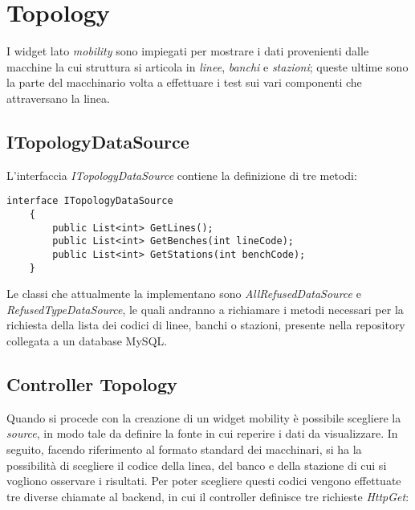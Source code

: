 \section{Topology}
\label{chap:topology}
I widget lato \textit{mobility} sono impiegati per mostrare i dati provenienti dalle macchine la cui struttura si articola in \textit{linee}, \textit{banchi} e \textit{stazioni}; queste ultime sono la parte del macchinario volta a effettuare i test sui vari componenti che attraversano la linea.

\subsection{ITopologyDataSource}
L'interfaccia \textit{ITopologyDataSource} contiene la definizione di tre metodi:

\begin{lstlisting}[caption={ITopologyDataSource.cs}, style=javaScriptCode]
    interface ITopologyDataSource
    {
        public List<int> GetLines();
        public List<int> GetBenches(int lineCode);
        public List<int> GetStations(int benchCode);
    }
\end{lstlisting}
Le classi che attualmente la implementano sono \textit{AllRefusedDataSource} e\\ \textit{RefusedTypeDataSource}, le quali andranno a richiamare i metodi necessari per la richiesta della lista dei codici di linee, banchi o stazioni, presente nella repository collegata a un database MySQL.

\subsection{Controller Topology}
Quando si procede con la creazione di un widget mobility è possibile scegliere la \textit{source}, in modo tale da definire la fonte in cui reperire i dati da visualizzare. In seguito,  facendo riferimento al formato standard dei macchinari, si ha la possibilità di scegliere il codice della linea, del banco e della stazione di cui si vogliono osservare i risultati.
Per poter scegliere questi codici vengono effettuate tre diverse chiamate al backend, in cui il controller definisce tre richieste \textit{HttpGet}:

